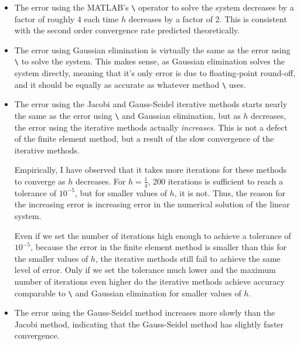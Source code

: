 \documentclass{homework}
\begin{document}
	\begin{itemize}
		\item The error using the MATLAB's \verb*|\| operator to solve the system decreases by a factor of roughly 4 each time $h$ decreases by a factor of 2. This is consistent with the second order convergence rate predicted theoretically.
		
		\item The error using Gaussian elimination is virtually the same as the error using \verb*|\| to solve the system. This makes sense, as Gaussian elimination solves the system directly, meaning that it's only error is due to floating-point round-off, and it should be equally as accurate as whatever method \verb*|\| uses.
		
		\item The error using the Jacobi and Gauss-Seidel iterative methods starts nearly the same as the error using \verb*|\| and Gaussian elimination, but as $h$ decreases, the error using the iterative methods actually \textit{increases}. This is not a defect of the finite element method, but a result of the slow convergence of the iterative methods.
		
		Empirically, I have observed that it takes more iterations for these methods to converge as $h$ decreases. For $h = \frac{1}{4}$, 200 iterations is sufficient to reach a tolerance of $10^{-5}$, but for smaller values of $h$, it is not. Thus, the reason for the increasing error is increasing error in the numerical solution of the linear system.
		
		Even if we set the number of iterations high enough to achieve a tolerance of $10^{-5}$, because the error in the finite element method is smaller than this for the smaller values of $h$, the iterative methods still fail to achieve the same level of error. Only if we set the tolerance much lower and the maximum number of iterations even higher do the iterative methods achieve accuracy comparable to \verb*|\| and Gaussian elimination for smaller values of $h$.
		
		\item The error using the Gauss-Seidel method increases more slowly than the Jacobi method, indicating that the Gauss-Seidel method has slightly faster convergence.
		
	\end{itemize}
	
	
	
	
\end{document}
